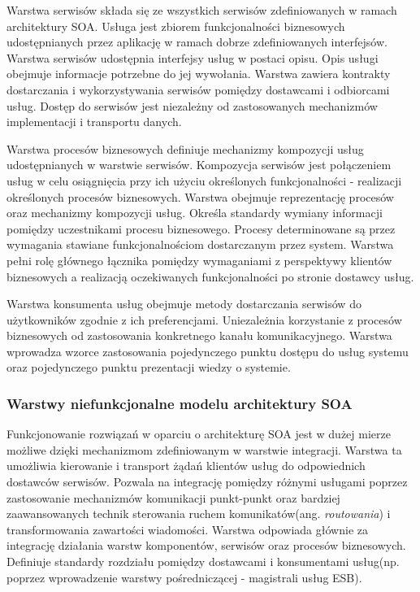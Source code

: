			Warstwa serwisów składa się ze wszystkich serwisów zdefiniowanych w ramach architektury SOA. Usługa jest zbiorem funkcjonalności biznesowych udostępnianych przez aplikację w ramach dobrze zdefiniowanych interfejsów. Warstwa serwisów udostępnia interfejsy usług w postaci opisu. Opis usługi obejmuje informacje potrzebne do jej wywołania. Warstwa zawiera kontrakty dostarczania i wykorzystywania serwisów pomiędzy dostawcami i odbiorcami usług. Dostęp do serwisów jest niezależny od zastosowanych mechanizmów implementacji i transportu danych. 

			Warstwa procesów biznesowych definiuje mechanizmy kompozycji usług udostępnianych w warstwie serwisów. Kompozycja serwisów jest połączeniem usług w celu osiągnięcia przy ich użyciu określonych funkcjonalności - realizacji określonych procesów biznesowych. Warstwa obejmuje reprezentację procesów oraz mechanizmy kompozycji usług. Określa standardy wymiany informacji pomiędzy uczestnikami procesu biznesowego. Procesy determinowane są przez wymagania stawiane funkcjonalnościom dostarczanym przez system. Warstwa pełni rolę głównego łącznika pomiędzy wymaganiami z perspektywy klientów biznesowych a realizacją oczekiwanych funkcjonalności po stronie dostawcy usług.

			Warstwa konsumenta usług obejmuje metody dostarczania serwisów do użytkowników zgodnie z ich preferencjami. Uniezależnia korzystanie z procesów biznesowych od zastosowania konkretnego kanału komunikacyjnego. Warstwa wprowadza wzorce zastosowania pojedynczego punktu dostępu do usług systemu oraz pojedynczego punktu prezentacji wiedzy o systemie.

		\subsubsection{Warstwy niefunkcjonalne modelu architektury SOA}

			Funkcjonowanie rozwiązań w oparciu o architekturę SOA jest w dużej mierze możliwe dzięki mechanizmom zdefiniowanym w warstwie integracji. Warstwa ta umożliwia kierowanie i transport żądań klientów usług do odpowiednich dostawców serwisów. Pozwala na integrację pomiędzy różnymi usługami poprzez zastosowanie mechanizmów komunikacji punkt-punkt oraz bardziej zaawansowanych technik sterowania ruchem komunikatów(ang. \textit{routowania}) i transformowania zawartości wiadomości. Warstwa odpowiada głównie za integrację działania warstw komponentów, serwisów oraz procesów biznesowych. Definiuje standardy rozdziału pomiędzy dostawcami i konsumentami usług(np. poprzez wprowadzenie warstwy pośredniczącej - magistrali usług ESB)\cite{Arsanjani07}.

